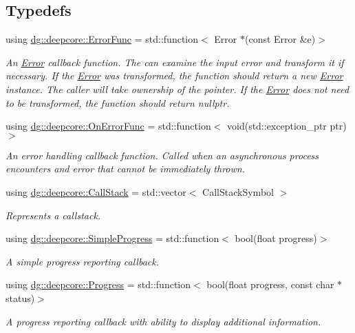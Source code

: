 \subsection*{Typedefs}
\begin{DoxyCompactItemize}
\item 
using \hyperlink{group___utility_module_gaa93ea71a4ed4c044369d3b323aec4435}{dg\+::deepcore\+::\+Error\+Func} = std\+::function$<$ Error $\ast$(const Error \&e)$>$
\begin{DoxyCompactList}\small\item\em An \hyperlink{classdg_1_1deepcore_1_1_error}{Error} callback function. The can examine the input error and transform it if necessary. If the \hyperlink{classdg_1_1deepcore_1_1_error}{Error} was transformed, the function should return a new \hyperlink{classdg_1_1deepcore_1_1_error}{Error} instance. The caller will take ownership of the pointer. If the \hyperlink{classdg_1_1deepcore_1_1_error}{Error} does not need to be transformed, the function should return nullptr. \end{DoxyCompactList}\item 
using \hyperlink{group___utility_module_ga21a199c126b87ba8bfe8ad7952dbaf3b}{dg\+::deepcore\+::\+On\+Error\+Func} = std\+::function$<$ void(std\+::exception\+\_\+ptr ptr)$>$
\begin{DoxyCompactList}\small\item\em An error handling callback function. Called when an asynchronous process encounters and error that cannot be immediately thrown. \end{DoxyCompactList}\item 
using \hyperlink{group___utility_module_gabdf2d70ae3aab3c57142eddec69a725c}{dg\+::deepcore\+::\+Call\+Stack} = std\+::vector$<$ Call\+Stack\+Symbol $>$
\begin{DoxyCompactList}\small\item\em Represents a callstack. \end{DoxyCompactList}\item 
using \hyperlink{group___utility_module_ga6763018df79e4bdbcd8cd14cea5342b2}{dg\+::deepcore\+::\+Simple\+Progress} = std\+::function$<$ bool(float progress)$>$
\begin{DoxyCompactList}\small\item\em A simple progress reporting callback. \end{DoxyCompactList}\item 
using \hyperlink{group___utility_module_gae07fce8a40a5222a0dcd537a0b28a008}{dg\+::deepcore\+::\+Progress} = std\+::function$<$ bool(float progress, const char $\ast$status)$>$
\begin{DoxyCompactList}\small\item\em A progress reporting callback with ability to display additional information. \end{DoxyCompactList}\end{DoxyCompactItemize}
